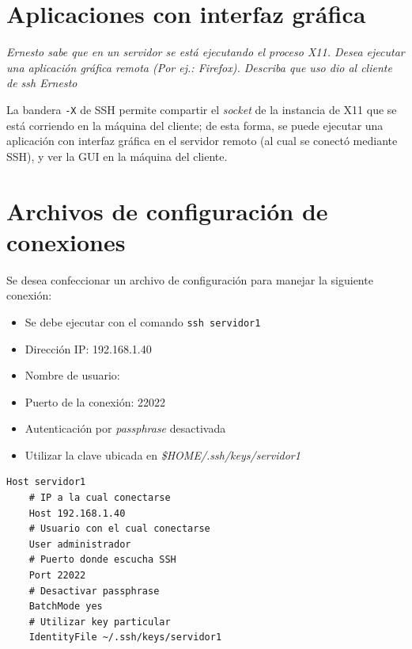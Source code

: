 \section{Aplicaciones con interfaz gráfica}

\emph{Ernesto sabe que en un servidor se está ejecutando el proceso X11. Desea ejecutar una aplicación gráfica remota (Por ej.: Firefox).  Describa que uso dio al cliente de ssh Ernesto}
\vspace*{5mm}

La bandera \texttt{-X} de SSH permite compartir el \emph{socket} de la instancia de X11 que se está corriendo en la máquina del cliente; de esta forma, se puede ejecutar una aplicación con interfaz gráfica en el servidor remoto (al cual se conectó mediante SSH), y ver la GUI en la máquina del cliente.  

\section{Archivos de configuración de conexiones}

Se desea confeccionar un archivo de configuración para manejar la siguiente conexión:

\begin{itemize}
    \item Se debe ejecutar con el comando \texttt{ssh servidor1} 
    \item Dirección IP: 192.168.1.40
    \item Nombre de usuario: 
    \item Puerto de la conexión: 22022
    \item Autenticación por \emph{passphrase} desactivada 
    \item Utilizar la clave ubicada en \emph{\$HOME/.ssh/keys/servidor1} 
\end{itemize}

\begin{lstlisting}
Host servidor1
    # IP a la cual conectarse
    Host 192.168.1.40
    # Usuario con el cual conectarse
    User administrador
    # Puerto donde escucha SSH
    Port 22022
    # Desactivar passphrase
    BatchMode yes
    # Utilizar key particular
    IdentityFile ~/.ssh/keys/servidor1
\end{lstlisting}












\clearpage
\printbibliography


